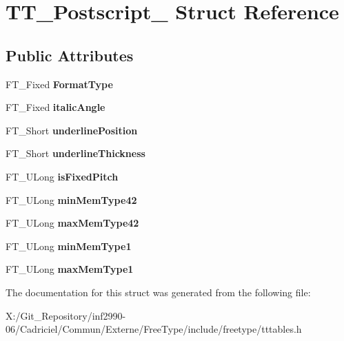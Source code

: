 \hypertarget{struct_t_t___postscript__}{\section{T\-T\-\_\-\-Postscript\-\_\- Struct Reference}
\label{struct_t_t___postscript__}
}
\subsection*{Public Attributes}
\begin{DoxyCompactItemize}
\item 
\hypertarget{struct_t_t___postscript___a5ed6585c01fa4ffc3f8537d58bdd955f}{F\-T\-\_\-\-Fixed {\bfseries Format\-Type}}\label{struct_t_t___postscript___a5ed6585c01fa4ffc3f8537d58bdd955f}

\item 
\hypertarget{struct_t_t___postscript___adcca36c7fbcbdff00fc8c2884a215830}{F\-T\-\_\-\-Fixed {\bfseries italic\-Angle}}\label{struct_t_t___postscript___adcca36c7fbcbdff00fc8c2884a215830}

\item 
\hypertarget{struct_t_t___postscript___a909fd5064ab7547bb8ed984b5dfe2fe2}{F\-T\-\_\-\-Short {\bfseries underline\-Position}}\label{struct_t_t___postscript___a909fd5064ab7547bb8ed984b5dfe2fe2}

\item 
\hypertarget{struct_t_t___postscript___a4e4654766a4f27054c9a35958515e186}{F\-T\-\_\-\-Short {\bfseries underline\-Thickness}}\label{struct_t_t___postscript___a4e4654766a4f27054c9a35958515e186}

\item 
\hypertarget{struct_t_t___postscript___ab9a537994be4f81cb35f61f83cd97949}{F\-T\-\_\-\-U\-Long {\bfseries is\-Fixed\-Pitch}}\label{struct_t_t___postscript___ab9a537994be4f81cb35f61f83cd97949}

\item 
\hypertarget{struct_t_t___postscript___ad78af4931654c197d4a8d0f04d473885}{F\-T\-\_\-\-U\-Long {\bfseries min\-Mem\-Type42}}\label{struct_t_t___postscript___ad78af4931654c197d4a8d0f04d473885}

\item 
\hypertarget{struct_t_t___postscript___a70c4ba372d04e686208f0fede9885314}{F\-T\-\_\-\-U\-Long {\bfseries max\-Mem\-Type42}}\label{struct_t_t___postscript___a70c4ba372d04e686208f0fede9885314}

\item 
\hypertarget{struct_t_t___postscript___a91a8b40f60e67a1920209e6b08355848}{F\-T\-\_\-\-U\-Long {\bfseries min\-Mem\-Type1}}\label{struct_t_t___postscript___a91a8b40f60e67a1920209e6b08355848}

\item 
\hypertarget{struct_t_t___postscript___a944a3df5127262db0f7ae92868defb99}{F\-T\-\_\-\-U\-Long {\bfseries max\-Mem\-Type1}}\label{struct_t_t___postscript___a944a3df5127262db0f7ae92868defb99}

\end{DoxyCompactItemize}


The documentation for this struct was generated from the following file\-:\begin{DoxyCompactItemize}
\item 
X\-:/\-Git\-\_\-\-Repository/inf2990-\/06/\-Cadriciel/\-Commun/\-Externe/\-Free\-Type/include/freetype/tttables.\-h\end{DoxyCompactItemize}
